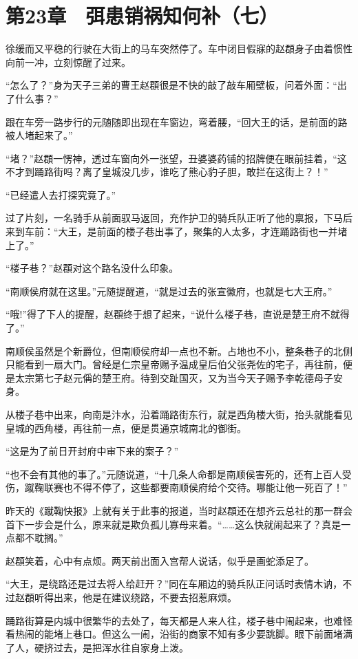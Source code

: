 \section{第23章　弭患销祸知何补（七）}

徐缓而又平稳的行驶在大街上的马车突然停了。车中闭目假寐的赵頵身子由着惯性向前一冲，立刻惊醒了过来。

“怎么了？”身为天子三弟的曹王赵頵很是不快的敲了敲车厢壁板，问着外面：“出了什么事？”

跟在车旁一路步行的元随随即出现在车窗边，弯着腰，“回大王的话，是前面的路被人堵起来了。”

“堵？”赵頵一愣神，透过车窗向外一张望，丑婆婆药铺的招牌便在眼前挂着，“这不才到踊路街吗？离了皇城没几步，谁吃了熊心豹子胆，敢拦在这街上？！”

“已经遣人去打探究竟了。”

过了片刻，一名骑手从前面驭马返回，充作护卫的骑兵队正听了他的禀报，下马后来到车前：“大王，是前面的楼子巷出事了，聚集的人太多，才连踊路街也一并堵上了。”

“楼子巷？”赵頵对这个路名没什么印象。

“南顺侯府就在这里。”元随提醒道，“就是过去的张宣徽府，也就是七大王府。”

“哦!”得了下人的提醒，赵頵终于想了起来，“说什么楼子巷，直说是楚王府不就得了。”

南顺侯虽然是个新爵位，但南顺侯府却一点也不新。占地也不小，整条巷子的北侧只能看到一扇大门。曾经是仁宗皇帝赐予温成皇后伯父张尧佐的宅子，再往前，便是太宗第七子赵元偁的楚王府。待到交趾国灭，又为当今天子赐予李乾德母子安身。

从楼子巷中出来，向南是汴水，沿着踊路街东行，就是西角楼大街，抬头就能看见皇城的西角楼，再往前一点，便是贯通京城南北的御街。

“这是为了前日开封府中审下来的案子？”

“也不会有其他的事了。”元随说道，“十几条人命都是南顺侯害死的，还有上百人受伤，蹴鞠联赛也不得不停了，这些都要南顺侯府给个交待。哪能让他一死百了！”

昨天的《蹴鞠快报》上就有关于此事的报道，当时赵頵还在想齐云总社的那一群会首下一步会是什么，原来就是欺负孤儿寡母来着。“……这么快就闹起来了？真是一点都不耽搁。”

赵頵笑着，心中有点烦。两天前出面入宫帮人说话，似乎是画蛇添足了。

“大王，是绕路还是过去将人给赶开？”同在车厢边的骑兵队正问话时表情木讷，不过赵頵听得出来，他是在建议绕路，不要去招惹麻烦。

踊路街算是内城中很繁华的去处了，每天都是人来人往，楼子巷中闹起来，也难怪看热闹的能堵上巷口。但这么一闹，沿街的商家不知有多少要跳脚。眼下前面堵满了人，硬挤过去，是把浑水往自家身上泼。

